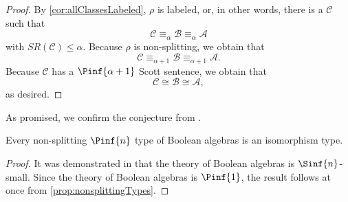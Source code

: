 \documentclass{amsart}
\renewcommand{\-}{\text{-}}
\begin{document}
\begin{proof}
By \cref{cor:allClassesLabeled}, $\rho$ is labeled, or, in other words, there is a $\mathcal{C}$ such that
\[\mathcal{C}\equiv_\alpha\mathcal{B}\equiv_\alpha\mathcal{A}\]
with $SR(\mathcal{C})\leq\alpha$.
Because $\rho$ is non-splitting, we obtain that 
\[\mathcal{C}\equiv_{\alpha+1}\mathcal{B}\equiv_{\alpha+1}\mathcal{A}.\]
Because $\mathcal{C}$ has a $\Pinf{\alpha+1}$ Scott sentence, we obtain that  
\[\mathcal{C}\cong\mathcal{B}\cong\mathcal{A},\]
as desired.
\end{proof}

As promised, we confirm the conjecture from \cite[Page 21]{HM}.

\begin{corollary}
Every non-splitting $\Pinf{n}$ type of Boolean algebras is an isomorphism type. 
\end{corollary}

\begin{proof}
  It was demonstrated in \cite{HM} that the theory of Boolean algebras is $\Sinf{n}$-small. Since the theory of Boolean algebras is $\Pinf{1}$, the result follows at once from \cref{prop:nonsplittingTypes}.
\end{proof}
\end{document}
